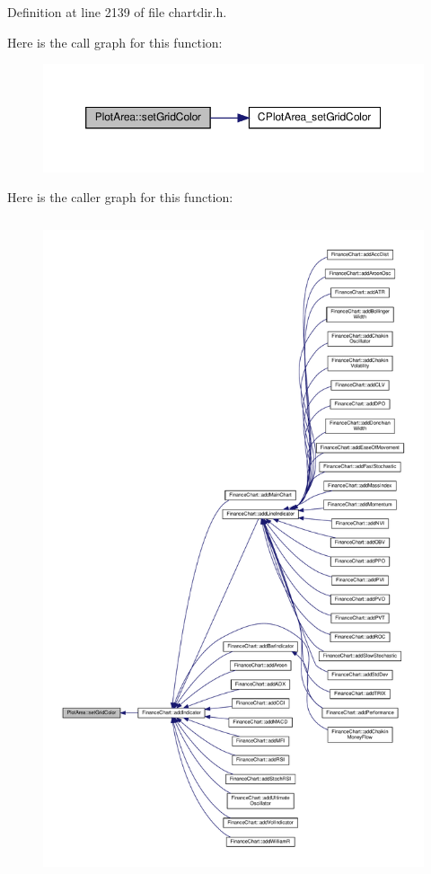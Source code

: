 Definition at line 2139 of file chartdir.\+h.

Here is the call graph for this function\+:
\nopagebreak
\begin{figure}[H]
\begin{center}
\leavevmode
\includegraphics[width=350pt]{class_plot_area_a5f02a40eeaf5fbde3332d5c6188f4556_cgraph}
\end{center}
\end{figure}
Here is the caller graph for this function\+:
\nopagebreak
\begin{figure}[H]
\begin{center}
\leavevmode
\includegraphics[height=550pt]{class_plot_area_a5f02a40eeaf5fbde3332d5c6188f4556_icgraph}
\end{center}
\end{figure}
\mbox{\label{class_plot_area_a12308305634a1a5026d0e80811af7645}} 
